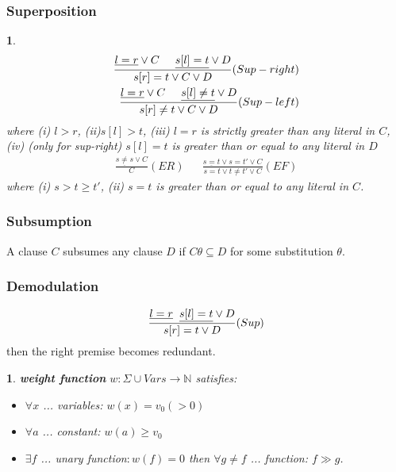 \documentclass[9pt]{extarticle}
\theoremstyle{theoremstyle}
\newtheorem*{green}{}
\newtheorem*{blue}{}
\begin{document}
\begin{multicols}{3}
\begin{minipage}[t]{.30\textwidth}
\subsubsection*{Superposition}
\begin{blue}
\begin{align*}
	\frac{\underline{l=r} \lor C \hspace{.5cm} \underline{s[l]=t} \lor D}{s[r]=t \lor C \lor D} (Sup-right)\\
	\frac{\underline{l=r} \lor C \hspace{.5cm} \underline{s[l]\not=t} \lor D}{s[r]\not=t \lor C \lor D} (Sup-left)\\
\end{align*}
where (i) $l>r$, (ii)$s[l]>t$, (iii) $l=r$ is strictly greater than any literal in $C$, (iv) (only for sup-right) $s[l]=t$ is greater than or equal to any literal in $D$
\begin{align*}
	\frac{\underline{s\not= s} \lor C}{C} (ER) && \frac{\underline{s=t} \lor s=t' \lor C}{s=t \lor t\not= t' \lor C} (EF)
\end{align*}
where (i) $s>t\geq t'$, (ii) $s=t$ is greater than or equal to any literal in $C$.
\end{blue}

\subsubsection*{Subsumption}
A clause $C$ subsumes any clause $D$ if $C\theta \subseteq D$ for some substitution $\theta$.

\subsubsection*{Demodulation}
\begin{align*}
	\frac{\underline{l=r} \hspace{0.2cm} \underline{s[l]=t} \lor D}{s[r]=t \lor D}(Sup)
\end{align*}
then the right premise becomes redundant.

\end{minipage}\hfil

\begin{minipage}[t]{.30\textwidth}

\begin{green}
	\textbf{weight function} $w:\Sigma \cup Vars \rightarrow \mathbb{N}$ satisfies:
	\begin{itemize}
		\item $\forall x$ ... variables: $ w(x) = v_0 (> 0)$
		\item $\forall a$ ... constant: $w(a) \geq v_0 $
		\item $\exists f$ ... unary function$: w(f)=0$ then $\forall g\not=f$ ... function: $f \gg g$.
	\end{itemize}
\end{green}


\end{minipage}
\end{multicols}
\end{document}
